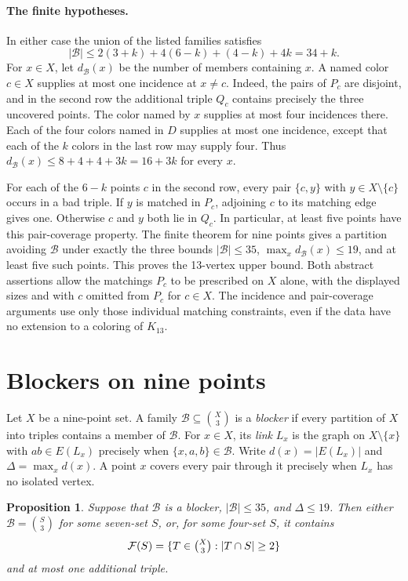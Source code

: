 \documentclass[11pt]{article}
\newtheorem{proposition}[theorem]{Proposition}
\begin{document}
\paragraph{The finite hypotheses.}
In either case the union of the listed families satisfies
\[
 |\mathcal B|\leq 2(3+k)+4(6-k)+(4-k)+4k=34+k.
\]
For $x\in X$, let $d_{\mathcal B}(x)$ be the number of members containing
$x$. A named color $c\in X$ supplies at most one incidence at $x\ne c$.
Indeed, the pairs of $P_c$ are disjoint, and in the second row the
additional triple $Q_c$ contains precisely the three uncovered points.
The color named by $x$ supplies at most four incidences there. Each of
the four colors named in $D$ supplies at most one incidence, except
that each of the $k$ colors in the last row may supply four. Thus
$d_{\mathcal B}(x)\leq 8+4+4+3k=16+3k$ for every $x$.

For each of the $6-k$ points $c$ in the second row, every pair
$\{c,y\}$ with $y\in X\setminus\{c\}$ occurs in a bad triple. If
$y$ is matched in $P_c$, adjoining $c$ to its matching edge gives
one. Otherwise $c$ and $y$ both lie in $Q_c$. In particular, at least
five points have this pair-coverage property. The finite theorem for
nine points gives a partition avoiding $\mathcal B$ under exactly the
three bounds $|\mathcal B|\leq35$, $\max_x d_{\mathcal B}(x)\leq19$,
and at least five such points. This proves the 13-vertex upper bound.
Both abstract assertions allow the matchings $P_c$ to be prescribed
on $X$ alone, with the displayed sizes and with
$c$ omitted from $P_c$ for $c\in X$. The incidence and pair-coverage
arguments use only those individual matching constraints, even if the
data have no extension to a coloring of $K_{13}$.

\section{Blockers on nine points}\label{sec:finite}

Let $X$ be a nine-point set. A family $\mathcal B\subseteq\binom X3$ is a
\emph{blocker} if every partition of $X$ into triples contains a member of
$\mathcal B$. For $x\in X$, its \emph{link} $L_x$ is the graph on
$X\setminus\{x\}$ with $ab\in E(L_x)$ precisely when $\{x,a,b\}\in\mathcal B$.
Write $d(x)=|E(L_x)|$ and $\Delta=\max_x d(x)$. A point $x$ covers every
pair through it precisely when $L_x$ has no isolated vertex.

\begin{proposition}\label{prop:classify-blockers}
Suppose that $\mathcal B$ is a blocker, $|\mathcal B|\le35$, and
$\Delta\le19$. Then either $\mathcal B=\binom S3$ for some seven-set $S$,
or, for some four-set $S$, it contains
\[
  \mathcal F(S)=\{T\in\tbinom X3:|T\cap S|\ge2\}
\]
and at most one additional triple.
\end{proposition}
\end{document}
